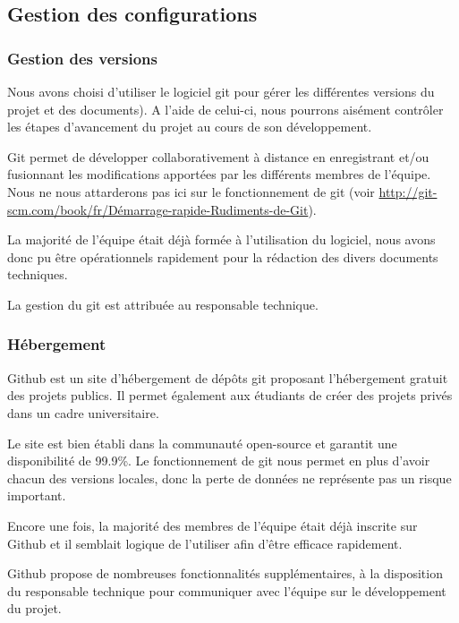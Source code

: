 \documentclass{../../res/univ-projet}
\begin{document}
	\subsection{Gestion des configurations}
		\subsubsection{Gestion des versions}

			Nous avons choisi d'utiliser le logiciel git pour gérer les différentes versions du projet et des documents). A l'aide de celui-ci, nous pourrons aisément contrôler les étapes d'avancement du projet au cours de son développement. 

			Git permet de développer collaborativement à distance en enregistrant et/ou fusionnant les modifications apportées par les différents membres de l'équipe. Nous ne nous attarderons pas ici sur le fonctionnement de git (voir \href{http://git-scm.com/book/fr/Démarrage-rapide-Rudiments-de-Git}{http://git-scm.com/book/fr/Démarrage-rapide-Rudiments-de-Git}).

			La majorité de l'équipe était déjà formée à l'utilisation du logiciel, nous avons donc pu être opérationnels rapidement pour la rédaction des divers documents techniques.

			La gestion du git est attribuée au responsable technique.

		\subsubsection{Hébergement}

			Github est un site d'hébergement de dépôts git proposant l'hébergement gratuit des projets publics. Il permet également aux étudiants de créer des projets privés dans un cadre universitaire.

			Le site est bien établi dans la communauté open-source et garantit une disponibilité de 99.9\%. Le fonctionnement de git nous permet en plus d'avoir chacun des versions locales, donc la perte de données ne représente pas un risque important.


			Encore une fois, la majorité des membres de l'équipe était déjà inscrite sur Github et il semblait logique de l'utiliser afin d'être efficace rapidement. 

			Github propose de nombreuses fonctionnalités supplémentaires, à la disposition du responsable technique pour communiquer avec l'équipe sur le développement du projet.
\end{document}
